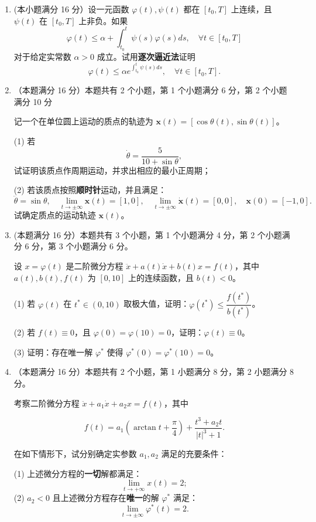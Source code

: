 \begin{enumerate}
\item[7.](本小题满分 16 分）设一元函数 \(\varphi(t), \psi(t)\) 都在 \([t_0, T]\) 上连续，且 \(\psi(t)\) 在 \([t_0, T]\) 上非负。如果
\[
\varphi(t) \leqslant \alpha + \int_{t_0}^t \psi(s)\varphi(s)ds, \quad \forall t \in [t_0, T]
\]
对于给定实常数 \(\alpha > 0\) 成立。试用\textbf{逐次逼近法}证明
\[
\varphi(t) \leqslant \alpha e^{\int_{t_0}^t \psi(s)ds}, \quad \forall t \in [t_0, T].
\]


\item[8.]（本题满分 16 分）本题共有 2 个小题，第 1 个小题满分 6 分，第 2 个小题满分 10 分

记一个在单位圆上运动的质点的轨迹为 \( \boldsymbol{x}(t) = [\cos \theta (t), \sin \theta (t)] \)。


(1) 若  
\[
\dot{\theta} = \frac{5}{10 + \sin \theta},
\]
试证明该质点作周期运动，并求出相应的最小正周期；

(2) 若该质点按照\textbf{顺时针}运动，并且满足：  
\[
\ddot{\theta} = \sin \theta, \quad \lim_{t \to \pm \infty} \boldsymbol{x}(t) = [1, 0], \quad 
\lim_{t \to \pm \infty} \dot{\boldsymbol{x}}(t) = [0, 0], \quad \boldsymbol{x}(0) = [-1, 0].
\]
试确定质点的运动轨迹 \( \boldsymbol{x}(t) \)。


\item[9.](本题满分 16 分）本题共有 3 个小题，第 1 个小题满分 4 分，第 2 个小题满分 6 分，第 3 个小题满分 6 分。

设 \( x = \varphi(t) \) 是二阶微分方程 \( \ddot{x} + a(t)\dot{x} + b(t)x = f(t) \)，其中 \( a(t), b(t), f(t) \) 为 \([0, 10]\) 上的连续函数，且 \( b(t) < 0 \)。


(1) 若 \( \varphi(t) \) 在 \( t^* \in (0, 10) \) 取极大值，证明：\( \varphi(t^*) \leq \dfrac{f(t^*)}{b(t^*)} \)。

(2) 若 \( f(t) \equiv 0 \)，且 \( \varphi(0) = \varphi(10) = 0 \)，证明：\( \varphi(t) \equiv 0 \)。

(3) 证明：存在唯一解 \( \varphi^* \) 使得 \( \varphi^*(0) = \varphi^*(10) = 0 \)。



\item[10.]（本题满分 16 分）本题共有 2 个小题，第 1 小题满分 8 分，第 2 小题满分 8 分。  

考察二阶微分方程 \( \ddot{x} + a_1 \dot{x} + a_2 x = f(t) \)，其中  

\[
f(t) = a_1 \left( \arctan t + \frac{\pi}{4} \right) + \frac{t^3 + a_2 t}{|t|^3 + 1}.
\]

在如下情形下，试分别确定实参数 \( a_1, a_2 \) 满足的充要条件：  

(1) 上述微分方程的\textbf{一切}解都满足：  
\[
\lim_{t \to +\infty} x(t) = 2;
\]
(2) \( a_2 < 0 \) 且上述微分方程存在\textbf{唯一}的解 \(\varphi^*\) 满足：  
\[
\lim_{t \to \pm\infty} \varphi^*(t) = 2.
\]
\end{enumerate}

